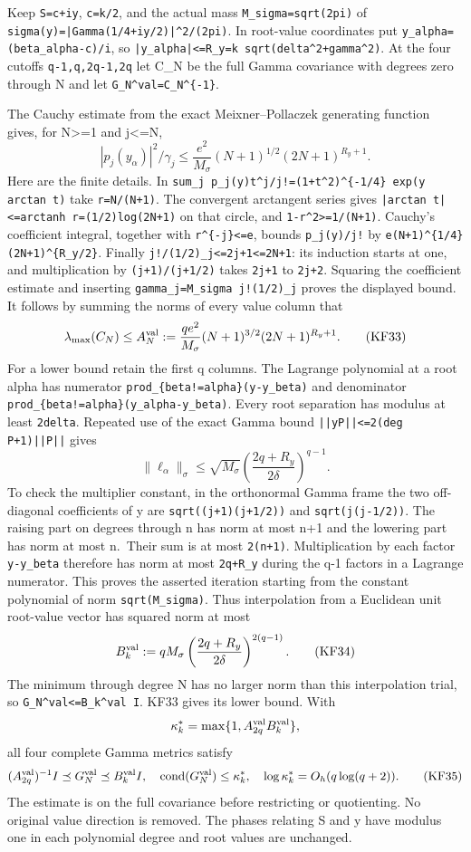 Keep \texttt{S=c+iy}, \texttt{c=k/2}, and the actual mass \nolinkurl{M_sigma=sqrt(2pi)} of \nolinkurl{sigma(y)=|Gamma(1/4+iy/2)|^2/(2pi)}. In root-value coordinates put \nolinkurl{y_alpha=(beta_alpha-c)/i}, so \nolinkurl{|y_alpha|<=R_y=k sqrt(delta^2+gamma^2)}. At the four cutoffs \texttt{q-1,q,2q-1,2q} let C\_N be the full Gamma covariance with degrees zero through N and let \nolinkurl{G_N^val=C_N^{-1}}.

The Cauchy estimate from the exact Meixner--Pollaczek generating function gives, for N\textgreater=1 and j\textless=N, \[
|p_j(y_\alpha)|^2/\gamma_j
\le\frac{e^2}{M_\sigma}(N+1)^{1/2}(2N+1)^{R_y+1}.
\] Here are the finite details. In \nolinkurl{sum_j p_j(y)t^j/j!=(1+t^2)^{-1/4} exp(y arctan t)} take \texttt{r=N/(N+1)}. The convergent arctangent series gives \nolinkurl{|arctan t|<=arctanh r=(1/2)log(2N+1)} on that circle, and \texttt{1-r\^{}2\textgreater{}=1/(N+1)}. Cauchy's coefficient integral, together with \texttt{r\^{}\{-j\}\textless{}=e}, bounds \texttt{\textbar{}p\_j(y)\textbar{}/j!} by \nolinkurl{e(N+1)^{1/4}(2N+1)^{R_y/2}}. Finally \nolinkurl{j!/(1/2)_j<=2j+1<=2N+1}: its induction starts at one, and multiplication by \texttt{(j+1)/(j+1/2)} takes \texttt{2j+1} to \texttt{2j+2}. Squaring the coefficient estimate and inserting \nolinkurl{gamma_j=M_sigma j!(1/2)_j} proves the displayed bound. It follows by summing the norms of every value column that \[
\lambda_{\max}(C_N)\le
A_N^{\rm val}:=\frac{qe^2}{M_\sigma}(N+1)^{3/2}
 (2N+1)^{R_y+1}.
\tag{KF33}
\] For a lower bound retain the first q columns. The Lagrange polynomial at a root alpha has numerator \nolinkurl{prod_{beta!=alpha}(y-y_beta)} and denominator \nolinkurl{prod_{beta!=alpha}(y_alpha-y_beta)}. Every root separation has modulus at least \texttt{2delta}. Repeated use of the exact Gamma bound \nolinkurl{||yP||<=2(deg P+1)||P||} gives \[
\|\ell_\alpha\|_\sigma
\le\sqrt{M_\sigma}
\left(\frac{2q+R_y}{2\delta}\right)^{q-1}.
\] To check the multiplier constant, in the orthonormal Gamma frame the two off-diagonal coefficients of y are \nolinkurl{sqrt((j+1)(j+1/2))} and \texttt{sqrt(j(j-1/2))}. The raising part on degrees through n has norm at most n+1 and the lowering part has norm at most n.~Their sum is at most \texttt{2(n+1)}. Multiplication by each factor \texttt{y-y\_beta} therefore has norm at most \texttt{2q+R\_y} during the q-1 factors in a Lagrange numerator. This proves the asserted iteration starting from the constant polynomial of norm \texttt{sqrt(M\_sigma)}. Thus interpolation from a Euclidean unit root-value vector has squared norm at most \[
B_k^{\rm val}:=qM_\sigma
 \left(\frac{2q+R_y}{2\delta}\right)^{2(q-1)}.
\tag{KF34}
\] The minimum through degree N has no larger norm than this interpolation trial, so \nolinkurl{G_N^val<=B_k^val I}. KF33 gives its lower bound. With \[
\kappa_k^*=\max\{1,A_{2q}^{\rm val}B_k^{\rm val}\},
\] all four complete Gamma metrics satisfy \[
(A_{2q}^{\rm val})^{-1}I\preceq G_N^{\rm val}
\preceq B_k^{\rm val}I,
\quad \operatorname{cond}(G_N^{\rm val})\le\kappa_k^*,
\quad\log\kappa_k^*=O_h(q\log(q+2)).
\tag{KF35}
\] The estimate is on the full covariance before restricting or quotienting. No original value direction is removed. The phases relating S and y have modulus one in each polynomial degree and root values are unchanged.

